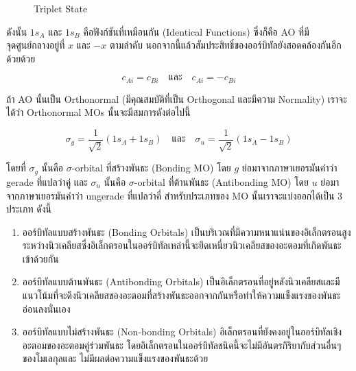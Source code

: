 \begin{figure}[htbp]
    \label{fig:MO_H2_triplet}
    \centering
    \begin{MOdiagram}[names,style=square]
    \end{MOdiagram}
    \caption{Triplet State}
\end{figure}

\noindent ดังนั้น $1 s_A$ และ $1 s_B$ คือฟังก์ชันที่เหมือนกัน (Identical Functions) ซึ่งก็คือ AO ที่มีจุดศูนย์กลางอยู่ที่ $x$ และ
$-x$ ตามลำดับ นอกจากนี้แล้วสัมประสิทธิ์ของออร์บิทัลยังสอดคล้องกันอีกด้วยด้วย

\begin{equation}
    c_{A i} = c_{B i}
    \quad \text{และ} \quad
    c_{A i} = -c_{B i}
\end{equation}

ถ้า AO นั้นเป็น Orthonormal (มีคุณสมบัติที่เป็น Orthogonal และมีความ Normality) เราจะได้ว่า Orthonormal MOs นั้นจะมีสมการดังต่อไปนี้

\begin{equation}
    \sigma_g
    =
    \frac{1}{\sqrt{2}}\left(1 s_A+1 s_B\right)
    \quad \text{และ} \quad
    \sigma_u
    =
    \frac{1}{\sqrt{2}}\left(1 s_A-1 s_B\right)
\end{equation}

\noindent โดยที่ $\sigma_g$ นั้นคือ $\sigma$-orbital ที่สร้างพันธะ (Bonding MO) โดย $g$ ย่อมาจากภาษาเยอรมันคำว่า gerade
ที่แปลว่าคู่ และ $\sigma_u$ นั้นคือ $\sigma$-orbital ที่ต้านพันธะ (Antibonding MO) โดย $u$ ย่อมาจากภาษาเยอรมันคำว่า ungerade
ที่แปลว่าคี่ สำหรับประเภทของ MO นั้นเราจะแบ่งออกได้เป็น 3 ประเภท ดังนี้

\begin{enumerate}[topsep=0pt,noitemsep]
    \setlength\itemsep{1em}
    \item ออร์บิทัลแบบสร้างพันธะ (Bonding Orbitals)
          เป็นบริเวณที่มีความหนาแน่นของอิเล็กตรอนสูงระหว่างนิวเคลียสซึ่งอิเล็กตรอนในออร์บิทัลเหล่านี้จะยึดเหนี่ยวนิวเคลียสของอะตอมที่เกิดพันธะเข้าด้วยกัน

    \item ออร์บิทัลแบบต้านพันธะ (Antibonding Orbitals)
          เป็นอิเล็กตรอนที่อยู่หลังนิวเคลียสและมีแนวโน้มที่จะดึงนิวเคลียสของอะตอมที่สร้างพันธะออกจากกันหรือทำให้ความแข็งแรงของพันธะอ่อนลงนั่นเอง

    \item ออร์บิทัลแบบไม่สร้างพันธะ (Non-bonding Orbitals)
          อิเล็กตรอนที่ยังคงอยู่ในออร์บิทัลเชิงอะตอมของอะตอมคู่ร่วมพันธะ โดยอิเล็กตรอนในออร์บิทัลชนิดนี้จะไม่มีอันตรกิริยากับส่วนอื่นๆของโมเลกุลและ%
          ไม่มีผลต่อความแข็งแรงของพันธะด้วย
\end{enumerate}

